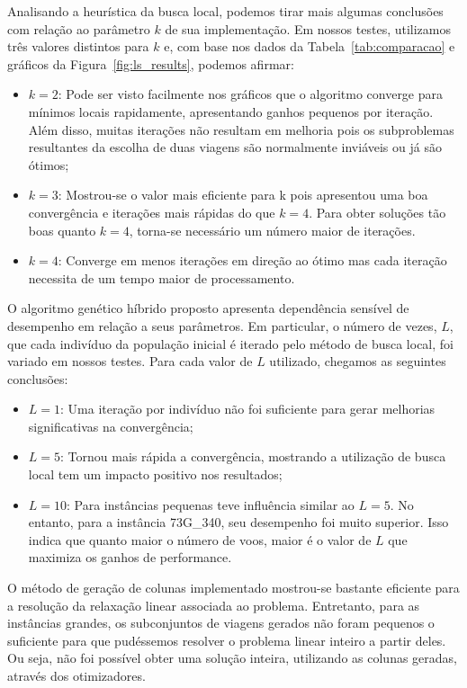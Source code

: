 Analisando a heurística da busca local, podemos tirar mais algumas conclusões com relação ao
parâmetro $k$ de sua implementação. Em nossos testes, utilizamos três valores distintos para $k$ 
e, com base nos dados da Tabela~\ref{tab:comparacao} e gráficos da Figura~\ref{fig:ls_results}, 
podemos afirmar:

\begin{itemize}
\item $k = 2$: Pode ser visto facilmente nos gráficos que o algoritmo converge para mínimos locais
rapidamente, apresentando ganhos pequenos por iteração. Além disso, muitas iterações não resultam em
melhoria pois os subproblemas resultantes da escolha de duas viagens são normalmente inviáveis ou já
são ótimos; 
\item $k = 3$: Mostrou-se o valor mais eficiente para k pois apresentou uma boa convergência e
iterações mais rápidas do que $k = 4$. Para obter soluções tão boas quanto $k = 4$, torna-se
necessário um número maior de iterações.
\item $k = 4$: Converge em menos iterações em direção ao ótimo mas cada iteração necessita de um
tempo maior de processamento.
\end{itemize}

O algoritmo genético híbrido proposto apresenta dependência sensível de desempenho em relação a
seus parâmetros. Em particular, o número de vezes, $L$, que cada indivíduo da população inicial é
iterado pelo método de busca local, foi variado em nossos testes. Para cada valor de $L$ utilizado,
chegamos as seguintes conclusões:

\begin{itemize}
\item $L = 1$: Uma iteração por indivíduo não foi suficiente para gerar melhorias significativas na
convergência;
\item $L = 5$: Tornou mais rápida a convergência, mostrando a utilização de busca local tem um
impacto positivo nos resultados;
\item $L = 10$: Para instâncias pequenas teve influência similar ao $L = 5$. No entanto, para a
instância 73G\_340, seu desempenho foi muito superior. Isso indica que quanto maior o número de
voos, maior é o valor de $L$ que maximiza os ganhos de performance.
\end{itemize}

O método de geração de colunas implementado mostrou-se bastante eficiente para a resolução da
relaxação linear associada ao problema. Entretanto, para as instâncias grandes, os subconjuntos de
viagens gerados não foram pequenos o suficiente para que pudéssemos resolver o problema linear
inteiro a partir deles. Ou seja, não foi possível obter uma solução inteira, utilizando as colunas
geradas, através dos otimizadores.

